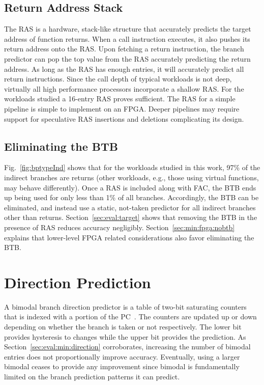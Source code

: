 \subsection{Return Address Stack}
\label{sec:min:target:ras}
The RAS is a hardware, stack-like structure that accurately predicts the target address of function returns. When a call instruction executes, it also pushes its return address  onto the RAS. Upon fetching a return instruction, the branch predictor can pop the top value from the RAS  accurately predicting the return address. As long as the RAS has enough entries, it will accurately predict all return instructions. Since the call depth of typical workloads is not deep, virtually all high performance processors incorporate a shallow RAS. For the workloads studied a 16-entry RAS proves sufficient. The RAS for a simple pipeline is simple to implement on an FPGA. Deeper pipelines may require support for speculative RAS insertions and deletions complicating its design. 


\subsection{Eliminating the BTB}
\label{sec:min:target:nobtb}
Fig.~\ref{fig:bptypeInd} shows that for the workloads studied in this work, 97\% of the indirect branches are returns (other workloads, e.g., those using virtual functions, may behave differently). Once a RAS is included along with FAC, the BTB ends up being used for only less than 1\% of all branches. Accordingly, the BTB can be eliminated, and instead use a static, not-taken predictor for all indirect branches other than returns. Section~\ref{sec:eval:target} shows that removing the BTB in the presence of RAS reduces accuracy negligibly. Section~\ref{sec:min:fpga:nobtb} explains that lower-level FPGA related considerations also favor eliminating the BTB.

\section{Direction Prediction}
\label{sec:min:direction}
A bimodal branch direction predictor is a table of two-bit saturating counters that is indexed with a portion of the PC~\cite{bimodal}. The counters are updated up or down depending on whether the branch is taken or not respectively. The lower bit provides hysteresis to changes while the upper bit provides the prediction. As Section~\ref{sec:eval:min:direction} corroborates, increasing the number of bimodal entries does not proportionally improve accuracy. Eventually, using a larger bimodal ceases to provide any improvement since bimodal is fundamentally limited on the branch prediction patterns it can predict.

